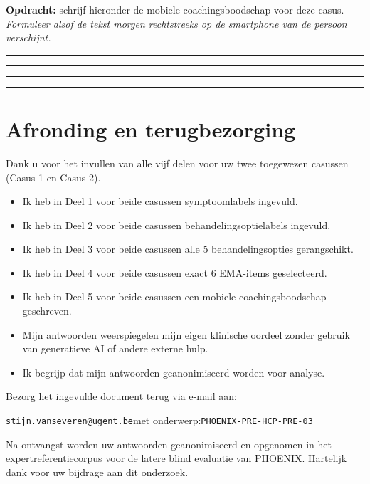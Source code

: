 \documentclass[11pt,a4paper]{article}
\newcommand{\writeline}{\vspace{0.22em}\noindent\rule{\linewidth}{0.25pt}\vspace{0.42em}\par}
\newcommand{\messagelines}{\writeline\writeline\writeline\writeline}
\begin{document}
\begin{responsebox}
\small\textbf{Opdracht:} schrijf hieronder de mobiele coachingsboodschap voor deze casus.
\textit{Formuleer alsof de tekst morgen rechtstreeks op de smartphone van de persoon verschijnt.}

\messagelines
\end{responsebox}

\vspace{0.6em}
\newpage


\section{Afronding en terugbezorging}

Dank u voor het invullen van alle vijf delen voor uw twee toegewezen casussen
(Casus 1 en Casus 2).

\begin{instrbox}[title=Checklist voor terugbezorging]
\begin{itemize}
\item[$\square$] Ik heb in Deel 1 voor beide casussen symptoomlabels ingevuld.
\item[$\square$] Ik heb in Deel 2 voor beide casussen behandelingsoptielabels ingevuld.
\item[$\square$] Ik heb in Deel 3 voor beide casussen alle 5 behandelingsopties gerangschikt.
\item[$\square$] Ik heb in Deel 4 voor beide casussen exact 6 EMA-items geselecteerd.
\item[$\square$] Ik heb in Deel 5 voor beide casussen een mobiele coachingsboodschap geschreven.
\item[$\square$] Mijn antwoorden weerspiegelen mijn eigen klinische oordeel zonder gebruik van generatieve AI of andere externe hulp.
\item[$\square$] Ik begrijp dat mijn antwoorden geanonimiseerd worden voor analyse.
\end{itemize}
\end{instrbox}

\medskip
Bezorg het ingevulde document terug via e-mail aan:
\begin{center}
\texttt{stijn.vanseveren@ugent.be}\quad met onderwerp:\quad \texttt{PHOENIX-PRE-HCP-PRE-03}
\end{center}

\vspace{0.5em}
\begin{tcolorbox}[colback=AccentBlue,colframe=PrimaryBlue,arc=2mm,boxrule=0.6pt,left=8pt,right=8pt,top=7pt,bottom=7pt]
\small\centering
Na ontvangst worden uw antwoorden geanonimiseerd en opgenomen in het expertreferentiecorpus
voor de latere blind evaluatie van PHOENIX. Hartelijk dank voor uw bijdrage aan dit onderzoek.
\end{tcolorbox}
\end{document}
